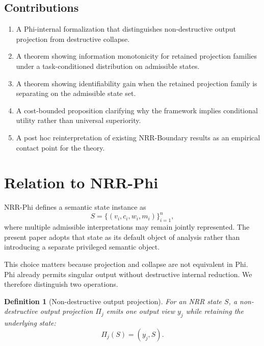 \documentclass[11pt,a4paper]{article}
\newtheorem{definition}{Definition}
\begin{document}
\subsection{Contributions}

\begin{enumerate}
  \item A Phi-internal formalization that distinguishes non-destructive output projection from destructive collapse.
  \item A theorem showing information monotonicity for retained projection families under a task-conditioned distribution on admissible states.
  \item A theorem showing identifiability gain when the retained projection family is separating on the admissible state set.
  \item A cost-bounded proposition clarifying why the framework implies conditional utility rather than universal superiority.
  \item A post hoc reinterpretation of existing NRR-Boundary results \cite{saito2026boundary} as an empirical contact point for the theory.
\end{enumerate}

\section{Relation to NRR-Phi}
\label{sec:phi}

NRR-Phi \cite{saito2026phi} defines a semantic state instance as
\begin{equation}
S = \{(v_i, c_i, w_i, m_i)\}_{i=1}^{n},
\end{equation}
where multiple admissible interpretations may remain jointly represented. The present paper adopts that state as its default object of analysis rather than introducing a separate privileged semantic object.

This choice matters because projection and collapse are not equivalent in Phi. Phi already permits singular output without destructive internal reduction. We therefore distinguish two operations.

\begin{definition}[Non-destructive output projection]
For an NRR state $S$, a non-destructive output projection $\Pi_j$ emits one output view $y_j$ while retaining the underlying state:
\begin{equation}
\Pi_j(S) = (y_j, S).
\end{equation}
\end{definition}
\end{document}
